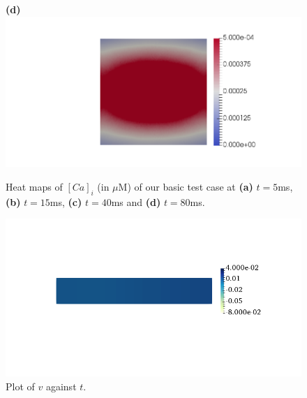 \documentclass[12pt,a4paper]{article}
\begin{document}
\begin{figure}
\begin{minipage}{0.47\textwidth}
  \textbf{(d)} \includegraphics[trim=9cm 0cm 2cm 0cm, clip=true, width=0.9\linewidth]{Casl80}
    \end{minipage}
    \caption{Heat maps of $[Ca]_i$ (in $\mu$M) of our basic test case at \textbf{(a)} $t=5$ms, \textbf{(b)} $t=15$ms, \textbf{(c)} $t=40$ms and \textbf{(d)} $t=80$ms.}
    \label{fig:2}
\end{figure}

\begin{figure}
   \includegraphics[width=1\linewidth]{v150} 
    \caption{Plot of $v$ against $t$.}
    \label{fig:3}
\end{figure}
\end{document}
